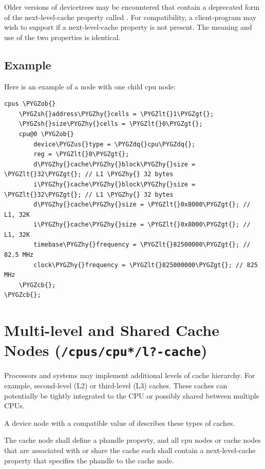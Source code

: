 \documentclass[a4paper,10pt,oneside]{sphinxmanual}
\def\PYGZus{\char`\_}
\def\PYGZob{\char`\{}
\def\PYGZcb{\char`\}}
\def\PYGZlt{\char`\<}
\def\PYGZgt{\char`\>}
\def\PYGZsh{\char`\#}
\def\PYGZhy{\char`\-}
\def\PYGZdq{\char`\"}
\begin{document}
Older versions of devicetrees may be encountered that contain a
deprecated form of the next-level-cache property called .
For compatibility, a client-program may wish to support 
if a next-level-cache property is not present.
The meaning and use of the two properties is identical.


\subsection{Example}
\label{devicenodes:sect-cpu-node-example}\label{devicenodes:example}
Here is an example of a  node with one child cpu node:

\begin{Verbatim}[commandchars=\\\{\}]
cpus \PYGZob{}
    \PYGZsh{}address\PYGZhy{}cells = \PYGZlt{}1\PYGZgt{};
    \PYGZsh{}size\PYGZhy{}cells = \PYGZlt{}0\PYGZgt{};
    cpu@0 \PYGZob{}
        device\PYGZus{}type = \PYGZdq{}cpu\PYGZdq{};
        reg = \PYGZlt{}0\PYGZgt{};
        d\PYGZhy{}cache\PYGZhy{}block\PYGZhy{}size = \PYGZlt{}32\PYGZgt{}; // L1 \PYGZhy{} 32 bytes
        i\PYGZhy{}cache\PYGZhy{}block\PYGZhy{}size = \PYGZlt{}32\PYGZgt{}; // L1 \PYGZhy{} 32 bytes
        d\PYGZhy{}cache\PYGZhy{}size = \PYGZlt{}0x8000\PYGZgt{}; // L1, 32K
        i\PYGZhy{}cache\PYGZhy{}size = \PYGZlt{}0x8000\PYGZgt{}; // L1, 32K
        timebase\PYGZhy{}frequency = \PYGZlt{}82500000\PYGZgt{}; // 82.5 MHz
        clock\PYGZhy{}frequency = \PYGZlt{}825000000\PYGZgt{}; // 825 MHz
    \PYGZcb{};
\PYGZcb{};
\end{Verbatim}


\section{Multi-level and Shared Cache Nodes (\texttt{/cpus/cpu*/l?-cache})}
\label{devicenodes:multi-level-and-shared-cache-nodes-cpus-cpu-l-cache}
Processors and systems may implement additional levels of cache hierarchy.
For example, second-level (L2) or third-level (L3) caches.
These caches can potentially be tightly integrated to the CPU or
possibly shared between multiple CPUs.

A device node with a compatible value of  describes these types
of caches.

The cache node shall define a phandle property, and all cpu nodes or
cache nodes that are associated with or share the cache each shall
contain a next-level-cache property that specifies the phandle to the
cache node.
\end{document}
